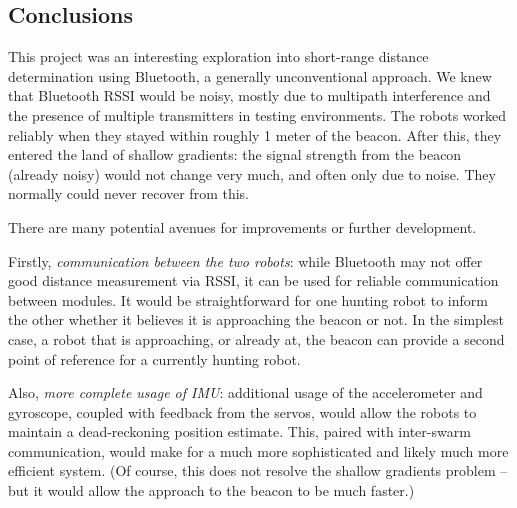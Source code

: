 \documentclass[]{article}
\begin{document}
\subsection{Conclusions}

This project was an interesting exploration into short-range distance
determination using Bluetooth, a generally unconventional approach.
We knew that Bluetooth RSSI would be noisy, mostly due to multipath interference and the presence of multiple transmitters in testing environments.
The robots worked reliably when they stayed within roughly 1 meter of the beacon.
After this, they entered the land of shallow gradients:
the signal strength from the beacon (already noisy) would not change very
much, and often only due to noise.
They normally could never recover from this.



There are many potential avenues for improvements or further
development.

Firstly, \emph{communication between the two robots}: while Bluetooth may not offer good distance measurement via RSSI, it can be used for reliable  communication between modules.
It would be straightforward for one hunting robot to inform the other whether it believes it is approaching the beacon or not.
In the simplest case, a robot that is approaching, or already at, the beacon can provide a second point of reference for a currently hunting robot.

Also, \emph{more complete usage of IMU}: additional usage of the accelerometer and gyroscope, coupled with feedback from the servos, would allow the robots to maintain a dead-reckoning position estimate.
This, paired with inter-swarm communication, would make for a much more sophisticated and likely much more efficient system.
(Of course, this does not resolve the shallow gradients problem -- but it would allow the approach to the beacon to be much faster.)

{}

\end{document}
